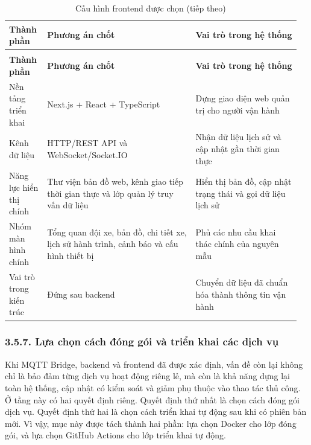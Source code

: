 \documentclass[a4paper]{extarticle}
\newcommand{\thesissettableid}[2]{%
  \renewcommand{\thetable}{#1}%
  \renewcommand{\theHtable}{#2}%
}
\begin{document}
{\thesissettableid{3.38}{condensed-bang-3-38-cau-hinh-frontend-duoc-chon}
\def\LTcaptype{table}
\begin{longtable}{|L{0.129\linewidth}|L{0.488\linewidth}|L{0.341\linewidth}|}
\caption{Cấu hình frontend được chọn}\label{tab:condensed-bang-3-38-cau-hinh-frontend-duoc-chon}\\
\hline
\textbf{Thành phần} & \textbf{Phương án chốt} & \textbf{Vai trò trong hệ thống} \\
\hline
\endfirsthead
\caption[]{Cấu hình frontend được chọn (tiếp theo)}\\
\hline
\textbf{Thành phần} & \textbf{Phương án chốt} & \textbf{Vai trò trong hệ thống} \\
\hline
\endhead
\endfoot
\endlastfoot
Nền tảng triển khai & Next.js + React + TypeScript & Dựng giao diện web quản trị cho người vận hành \\\hline
Kênh dữ liệu & HTTP/REST API và WebSocket/Socket.IO & Nhận dữ liệu lịch sử và cập nhật gần thời gian thực \\\hline
Năng lực hiển thị chính & Thư viện bản đồ web, kênh giao tiếp thời gian thực và lớp quản lý truy vấn dữ liệu & Hiển thị bản đồ, cập nhật trạng thái và gọi dữ liệu lịch sử \\\hline
Nhóm màn hình chính & Tổng quan đội xe, bản đồ, chi tiết xe, lịch sử hành trình, cảnh báo và cấu hình thiết bị & Phủ các nhu cầu khai thác chính của nguyên mẫu \\\hline
Vai trò trong kiến trúc & Đứng sau backend & Chuyển dữ liệu đã chuẩn hóa thành thông tin vận hành \\\hline
\end{longtable}
}

\subsubsection{3.5.7. Lựa chọn cách đóng gói và triển khai các dịch vụ}\label{lux1ef1a-chux1ecdn-cuxe1ch-ux111uxf3ng-guxf3i-vuxe0-triux1ec3n-khai-cuxe1c-dux1ecbch-vux1ee5}

Khi MQTT Bridge, backend và frontend đã được xác định, vấn đề còn lại không chỉ
là bảo đảm từng dịch vụ hoạt động riêng lẻ, mà còn là khả năng dựng lại toàn
hệ thống, cập nhật có kiểm soát và giảm phụ thuộc vào thao tác thủ công. Ở tầng
này có hai quyết định riêng. Quyết định thứ nhất là chọn cách đóng gói dịch vụ.
Quyết định thứ hai là chọn cách triển khai tự động sau khi có phiên bản mới. Vì
vậy, mục này được tách thành hai phần: lựa chọn Docker cho lớp đóng gói, và lựa
chọn GitHub Actions cho lớp triển khai tự động.
\end{document}
